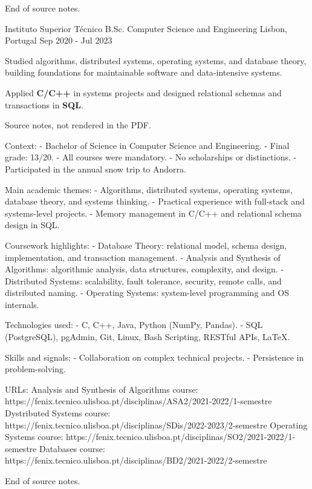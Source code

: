 \begin{cventries}
{      End of source notes.
    } %

  \cventry
    {Instituto Superior Técnico} %
    {B.Sc. Computer Science and Engineering} %
    {Lisbon, Portugal} %
    {Sep 2020 - Jul 2023} %
    {
      \begin{cvitems}
        \item {Studied algorithms, distributed systems, operating systems, and database theory, building foundations for maintainable software and data-intensive systems.}
        \item {Applied \textbf{C/C++} in systems projects and designed relational schemas and transactions in \textbf{SQL}.}
      \end{cvitems}
    } %
    {
      Source notes, not rendered in the PDF.

      Context:
      - Bachelor of Science in Computer Science and Engineering.
      - Final grade: 13/20.
      - All courses were mandatory.
      - No scholarships or distinctions.
      - Participated in the annual snow trip to Andorra.

      Main academic themes:
      - Algorithms, distributed systems, operating systems, database theory, and systems thinking.
      - Practical experience with full-stack and systems-level projects.
      - Memory management in C/C++ and relational schema design in SQL.

      Coursework highlights:
      - Database Theory: relational model, schema design, implementation, and transaction management.
      - Analysis and Synthesis of Algorithms: algorithmic analysis, data structures, complexity, and design.
      - Distributed Systems: scalability, fault tolerance, security, remote calls, and distributed naming.
      - Operating Systems: system-level programming and OS internals.

      Technologies used:
      - C, C++, Java, Python (NumPy, Pandas).
      - SQL (PostgreSQL), pgAdmin, Git, Linux, Bash Scripting, RESTful APIs, LaTeX.

      Skills and signals:
      - Collaboration on complex technical projects.
      - Persistence in problem-solving.

      URLs:
      Analysis and Synthesis of Algorithms course: https://fenix.tecnico.ulisboa.pt/disciplinas/ASA2/2021-2022/1-semestre
      Dystributed Systems course: https://fenix.tecnico.ulisboa.pt/disciplinas/SDis/2022-2023/2-semestre
      Operating Systems course: https://fenix.tecnico.ulisboa.pt/disciplinas/SO2/2021-2022/1-semestre
      Databases course: https://fenix.tecnico.ulisboa.pt/disciplinas/BD2/2021-2022/2-semestre

      End of source notes.
    } %
\end{cventries}
